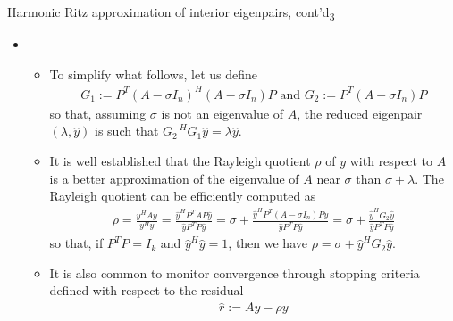 \documentclass[t,usepdftitle=false]{beamer}
\begin{document}
\begin{frame}{Harmonic Ritz approximation of interior eigenpairs, cont'd\textsubscript{3}}
	\begin{itemize}
	\item[]
	\begin{itemize}\normalsize
	\item To simplify what follows, let us define
	\begin{align*}
		G_1:=P^T(A-\sigma I_n)^H(A-\sigma I_n)P
		\text{ and }
		G_2:=P^T(A-\sigma I_n)P
	\end{align*}
	so that, assuming $\sigma$ is not an eigenvalue of $A$, the reduced eigenpair $(\lambda,\hat{y})$ is such that $G_2^{-H}G_1\hat{y}=\lambda \hat{y}$.
	\item It is well established that the Rayleigh quotient $\rho$ of $y$ with respect to $A$ is a better approximation of the eigenvalue of $A$ near $\sigma$ than $\sigma+\lambda$. The Rayleigh quotient can be efficiently computed as
	\begin{align*}
		\rho=\frac{y^HAy}{y^Hy}=\frac{\hat{y}^HP^TAP\hat{y}}{\hat{y}P^TP\hat{y}}
		=\sigma+\frac{\hat{y}^HP^T(A-\sigma I_n)P\hat{y}}{\hat{y}P^TP\hat{y}}
		=\sigma+\frac{\hat{y}^HG_2\hat{y}}{\hat{y}P^TP\hat{y}}
	\end{align*}
	so that, if $P^TP=I_k$ and $\hat{y}^H\hat{y}=1$, then we have $\boxed{\rho=\sigma+\hat{y}^HG_2\hat{y}}$.
	\item It is also common to monitor convergence through stopping criteria defined with respect to the residual
	\begin{align*}
		\hat{r}:=Ay-\rho y
	\end{align*}
	\end{itemize}
	\end{itemize}
\end{frame}
\end{document}
